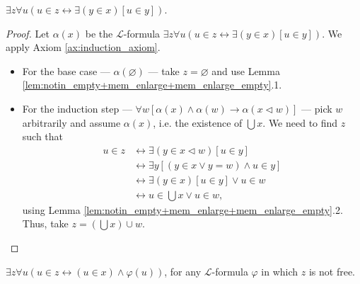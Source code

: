 \begin{theorem}
    \label{thm:exists_sUnion}
    \leanok
    $\exists z \forall u (u \in z \leftrightarrow \exists (y\in x)[u \in y])$.
\end{theorem}

\begin{proof}
    \leanok
    Let $\alpha (x)$ be the $\mathcal{L}$-formula 
    $\exists z \forall u (u \in z \leftrightarrow \exists (y\in x)[u \in y])$.
    We apply Axiom \ref{ax:induction_axiom}.
    \begin{itemize}
        \item For the base case — $\alpha (\varnothing)$ — take $z=\varnothing$ and use 
        Lemma \ref{lem:notin_empty+mem_enlarge+mem_enlarge_empty}.1.
        \item For the induction step 
        — $\forall w[\alpha(x) \land \alpha(w) \rightarrow \alpha(x \lhd w)]$ — 
        pick $w$ arbitrarily and assume $\alpha(x)$, i.e. the existence of $\bigcup x$.
        We need to find $z$ such that
        \begin{equation*}
        \begin{split}
            u \in z & \leftrightarrow \exists (y \in x \lhd w)[u \in y]\\
            & \leftrightarrow \exists y[(y \in x \lor y = w) \land u \in y]\\
            & \leftrightarrow \exists(y \in x)[u \in y] \lor u \in w\\
            & \leftrightarrow u \in \bigcup x \lor u \in w,
        \end{split}
        \end{equation*}
        using Lemma \ref{lem:notin_empty+mem_enlarge+mem_enlarge_empty}.2. 
        Thus, take $z = (\bigcup x) \cup w$.
    \end{itemize}
\end{proof}

\begin{theorem}
    \label{thm:comp_scheme}
    \leanok
    $\exists z \forall u (u\in z \leftrightarrow (u \in x) \land \varphi (u))$, 
    for any $\mathcal{L}$-formula $\varphi$ in which $z$ is not free.
\end{theorem}

